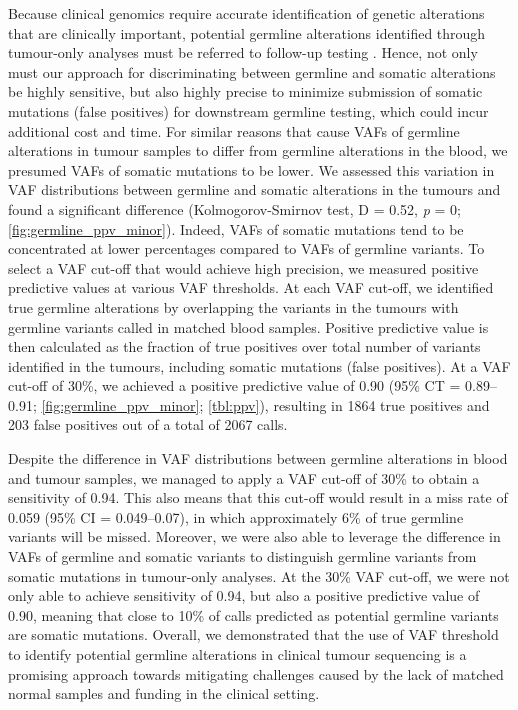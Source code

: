 Because clinical genomics require accurate identification of genetic alterations that are clinically important, potential germline alterations identified through tumour-only analyses must be referred to follow-up testing \cite{Raymond2016, Bombard2014, Green2013}. Hence, not only must our approach for discriminating between germline and somatic alterations be highly sensitive, but also highly precise to minimize submission of somatic mutations (false positives) for downstream germline testing, which could incur additional cost and time. For similar reasons that cause VAFs of germline alterations in tumour samples to differ from germline alterations in the blood, we presumed VAFs of somatic mutations to be lower. We assessed this variation in VAF distributions between germline and somatic alterations in the tumours and found a significant difference (Kolmogorov-Smirnov test, D = 0.52, \textit{p} = 0; \autoref{fig:germline_ppv_minor}). Indeed, VAFs of somatic mutations tend to be concentrated at lower percentages compared to VAFs of germline variants. To select a VAF cut-off that would achieve high precision, we measured positive predictive values at various VAF thresholds. At each VAF cut-off, we identified true germline alterations by overlapping the variants in the tumours with germline variants called in matched blood samples. Positive predictive value is then calculated as the fraction of true positives over total number of variants identified in the tumours, including somatic mutations (false positives). At a VAF cut-off of 30\%, we achieved a positive predictive value of 0.90 (95\% CT = 0.89--0.91; \autoref{fig:germline_ppv_minor}; \autoref{tbl:ppv}), resulting in 1864 true positives and 203 false positives out of a total of 2067 calls.

Despite the difference in VAF distributions between germline alterations in blood and tumour samples, we managed to apply a VAF cut-off of 30\% to obtain a sensitivity of 0.94. This also means that this cut-off would result in a miss rate of 0.059 (95\% CI = 0.049--0.07), in which approximately 6\% of true germline variants will be missed. Moreover, we were also able to leverage the difference in VAFs of germline and somatic variants to distinguish germline variants from somatic mutations in tumour-only analyses. At the 30\% VAF cut-off, we were not only able to achieve sensitivity of 0.94, but also a positive predictive value of 0.90, meaning that close to 10\% of calls predicted as potential germline variants are somatic mutations. Overall, we demonstrated that the use of VAF threshold to identify potential germline alterations in clinical tumour sequencing is a promising approach towards mitigating challenges caused by the lack of matched normal samples and funding in the clinical setting.

